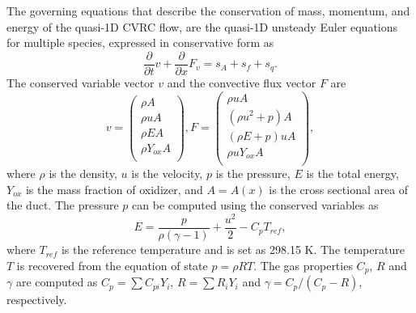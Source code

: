 The governing equations that describe the conservation of mass, momentum, and energy of the quasi-1D CVRC flow, are the quasi-1D unsteady Euler equations for multiple species, expressed in conservative form as
\begin{equation}\label{p4.eq:5p2.1}
\frac{\partial }{\partial t} v + \frac{\partial }{\partial x} F_v = s_A + s_f + s_q.
\end{equation}
The conserved variable vector $v$ and the convective flux vector $F$ are
\begin{equation}\label{p4.eq:5p2.2}
v= \left( \begin{gathered}
\rho A  \\
\rho uA  \\
\rho EA  \\
\rho Y_{ox} A \\
\end{gathered} \right), 
F = \left( \begin{gathered}
\rho uA  \\
\left(\rho u^2 + p\right)A  \\
\left(\rho E + p\right)uA  \\
\rho uY_{ox} A \\
\end{gathered} \right),
\end{equation}
where $\rho$ is the density, $u$ is the velocity, $p$ is the pressure, $E$ is the total energy, $Y_{ox}$ is the mass fraction of oxidizer, and $A=A(x)$ is the cross sectional area of the duct. The pressure $p$ can be computed using the conserved variables as
\begin{equation}\label{p4.eq:total-engery}
E = \frac{p}{\rho (\gamma - 1)} + \frac{u^2}{2} - C_p T_{ref},
\end{equation}
where $T_{ref}$ is the reference temperature and is set as 298.15 K. The temperature $T$ is recovered from the equation of state $p = \rho R T$. The gas properties  $C_p$, $R$ and $\gamma$ are computed as $C_p= \sum C_{pi}Y_i$, $R=\sum R_iY_i$ and $ \gamma= C_p/(C_p-R)$, respectively. 

